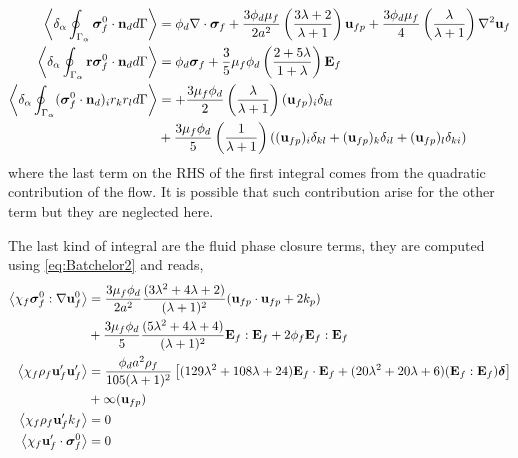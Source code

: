 \begin{align}
    \left<\delta_\alpha \oint_{\Gamma_{\alpha}} \bm{\sigma}_f^0\cdot \textbf{n}_d d\Gamma\right> &= 
    \phi_d \mathbf{\nabla}\cdot\bm\sigma_f
    + \frac{3\phi_d\mu_f}{2 a^2} 
    \left(\frac{3\lambda+2}{\lambda+1}\right) \textbf{u}_{f p} 
    + \frac{3\phi_d\mu_f}{4} \left(\frac{\lambda}{\lambda+1}\right)\mathbf{\nabla}^2\textbf{u}_f\\
    \left<\delta_\alpha \oint_{\Gamma_{\alpha}} \textbf{r}\bm{\sigma}_f^0 \cdot \textbf{n}_d d\Gamma\right> 
    &= 
    \phi_d \bm\sigma_f + 
    \frac{3}{5}\mu_f \phi_d \left(\frac{2+5\lambda}{1+\lambda}\right)
    \textbf{E}_f
    \\
        \left<\delta_\alpha \oint_{\Gamma_{\alpha}} (\bm{\sigma}_f^0 \cdot \textbf{n}_d)_ir_kr_l d\Gamma\right> &=
        + \frac{3\mu_f\phi_d}{2}\left(\frac{\lambda}{\lambda+1}\right)(\textbf{u}_{fp})_i\delta_{kl}\\
        &+ \frac{3\mu_f\phi_d}{5}\left(\frac{1}{\lambda+1}\right)((\textbf{u}_{fp})_i\delta_{kl}+ (\textbf{u}_{fp})_k\delta_{il}+(\textbf{u}_{fp})_l\delta_{ki})\nonumber
\end{align}
where the last term on the RHS of the first integral comes from the quadratic contribution of the flow. 
It is possible that such contribution arise for the other term but they are neglected here. 


The last kind of integral are the fluid phase closure terms, they are computed using \ref{eq:Batchelor2} and reads, 
\begin{align*}
    \left<\chi_f \bm\sigma_f^0 :\mathbf{\nabla}\textbf{u}_f^0\right>
    &=
    \frac{3\mu_f \phi_d}{2a^2}
    \frac{(3\lambda^2 + 4\lambda +2)}{(\lambda + 1)^2}
    (\textbf{u}_{fp}\cdot \textbf{u}_{fp} + 2 k_p ) \\
    &+ 
    \frac{3\mu_f \phi_d}{5}
    \frac{(5\lambda^2 + 4\lambda +4)}{(\lambda + 1)^2}
    \textbf{E}_f:\textbf{E}_f
    +2 \phi_f \textbf{E}_f:\textbf{E}_f \\
    \left<\chi_f \rho_f \textbf{u}_f' \textbf{u}_f'\right>
    &=
    \frac{\phi_d a^2 \rho_f}{105 (\lambda +1)^2 }\left[
        (129\lambda^2+108\lambda+24)\textbf{E}_f\cdot \textbf{E}_f
        + (20\lambda^2 +20\lambda + 6)
        (\textbf{E}_f : \textbf{E}_f)\bm\delta
    \right]\\
    &+\infty(\textbf{u}_{fp})\\
     \left<\chi_f\rho_f \textbf{u}_f' k_f\right> &=  0\\
    \left<\chi_f \textbf{u}_f' \cdot \bm{\sigma}_f^0\right> &=  0
\end{align*}


